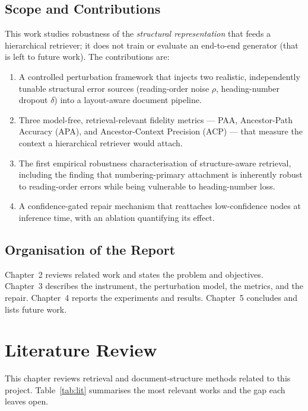 \documentclass[12pt,a4paper]{report}
\begin{document}
\section{Scope and Contributions}
This work studies robustness of the \emph{structural representation} that feeds a hierarchical
retriever; it does not train or evaluate an end-to-end generator (that is left to future work). The
contributions are:
\begin{enumerate}
  \item A controlled perturbation framework that injects two realistic, independently tunable
  structural error sources (reading-order noise $\rho$, heading-number dropout $\delta$) into a
  layout-aware document pipeline.
  \item Three model-free, retrieval-relevant fidelity metrics --- PAA, Ancestor-Path Accuracy (APA),
  and Ancestor-Context Precision (ACP) --- that measure the context a hierarchical retriever would
  attach.
  \item The first empirical robustness characterisation of structure-aware retrieval, including the
  finding that numbering-primary attachment is inherently robust to reading-order errors while being
  vulnerable to heading-number loss.
  \item A confidence-gated repair mechanism that reattaches low-confidence nodes at inference time,
  with an ablation quantifying its effect.
\end{enumerate}

\section{Organisation of the Report}
Chapter~2 reviews related work and states the problem and objectives. Chapter~3 describes the
instrument, the perturbation model, the metrics, and the repair. Chapter~4 reports the experiments
and results. Chapter~5 concludes and lists future work.

\chapter{Literature Review}
This chapter reviews retrieval and document-structure methods related to this project.
Table~\ref{tab:lit} summarises the most relevant works and the gap each leaves open.
\end{document}
